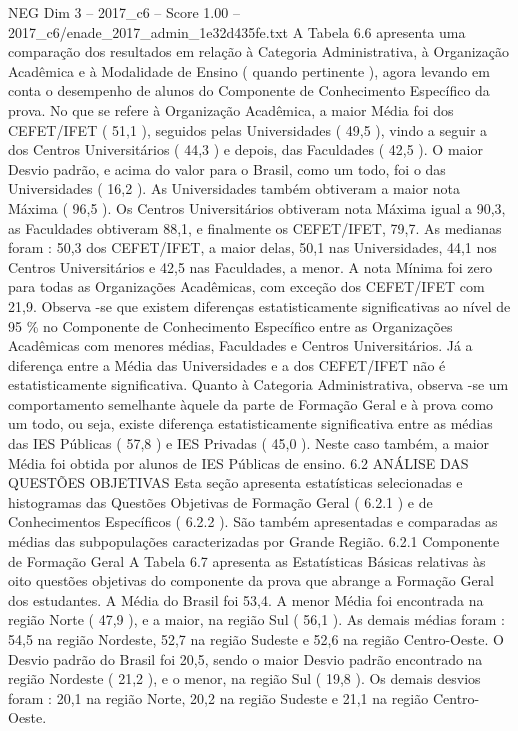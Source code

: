 \begin{textsample}{NEG Dim 3 – 2017\_c6 – Score 1.00 – 2017\_c6/enade\_2017\_admin\_1e32d435fe.txt}
A Tabela 6.6 apresenta uma comparação dos resultados em relação à Categoria Administrativa, à Organização Acadêmica e à Modalidade de Ensino ( quando pertinente ), agora levando em conta o desempenho de alunos do Componente de Conhecimento Específico da prova.
No que se refere à Organização Acadêmica, a maior Média foi dos CEFET/IFET ( 51,1 ), seguidos pelas Universidades ( 49,5 ), vindo a seguir a dos Centros Universitários ( 44,3 ) e depois, das Faculdades ( 42,5 ).
O maior Desvio padrão, e acima do valor para o Brasil, como um todo, foi o das Universidades ( 16,2 ).
As Universidades também obtiveram a maior nota Máxima ( 96,5 ).
Os Centros Universitários obtiveram nota Máxima igual a 90,3, as Faculdades obtiveram 88,1, e finalmente os CEFET/IFET, 79,7.
As medianas foram : 50,3 dos CEFET/IFET, a maior delas, 50,1 nas Universidades, 44,1 nos Centros Universitários e 42,5 nas Faculdades, a menor.
A nota Mínima foi zero para todas as Organizações Acadêmicas, com exceção dos CEFET/IFET com 21,9.
Observa -se que existem diferenças estatisticamente significativas ao nível de 95 \% no Componente de Conhecimento Específico entre as Organizações Acadêmicas com menores médias, Faculdades e Centros Universitários.
Já a diferença entre a Média das Universidades e a dos CEFET/IFET não é estatisticamente significativa.
Quanto à Categoria Administrativa, observa -se um comportamento semelhante àquele da parte de Formação Geral e à prova como um todo, ou seja, existe diferença estatisticamente significativa entre as médias das IES Públicas ( 57,8 ) e IES Privadas ( 45,0 ).
Neste caso também, a maior Média foi obtida por alunos de IES Públicas de ensino. 6.2 ANÁLISE DAS QUESTÕES OBJETIVAS Esta seção apresenta estatísticas selecionadas e histogramas das Questões Objetivas de Formação Geral ( 6.2.1 ) e de Conhecimentos Específicos ( 6.2.2 ).
São também apresentadas e comparadas as médias das subpopulações caracterizadas por Grande Região. 6.2.1 Componente de Formação Geral A Tabela 6.7 apresenta as Estatísticas Básicas relativas às oito questões objetivas do componente da prova que abrange a Formação Geral dos estudantes.
A Média do Brasil foi 53,4.
A menor Média foi encontrada na região Norte ( 47,9 ), e a maior, na região Sul ( 56,1 ).
As demais médias foram : 54,5 na região Nordeste, 52,7 na região Sudeste e 52,6 na região Centro-Oeste.
O Desvio padrão do Brasil foi 20,5, sendo o maior Desvio padrão encontrado na região Nordeste ( 21,2 ), e o menor, na região Sul ( 19,8 ).
Os demais desvios foram : 20,1 na região Norte, 20,2 na região Sudeste e 21,1 na região Centro-Oeste.

\end{textsample}
